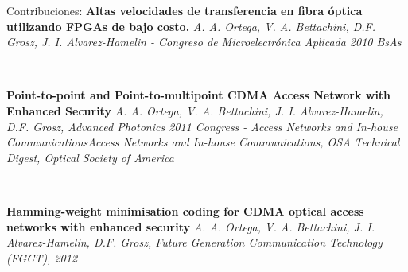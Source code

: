 \documentclass[aspectratio=169]{beamer}
\begin{document}



\begin{frame}{Contribuciones:}
\textbf{Altas velocidades de transferencia en fibra óptica utilizando FPGAs de bajo costo. } \textit{A. A. Ortega, V. A. Bettachini, D.F. Grosz, J. I. Alvarez-Hamelin - Congreso de Microelectrónica Aplicada 2010 BsAs}

\

\textbf{ Point-to-point and Point-to-multipoint CDMA Access Network with Enhanced Security} \textit{ A. A. Ortega, V. A. Bettachini, J. I. Alvarez-Hamelin,  D.F. Grosz, Advanced Photonics 2011 Congress - Access Networks and In-house CommunicationsAccess Networks and In-house Communications, OSA Technical Digest, Optical Society of America}

\

\textbf{Hamming-weight minimisation coding for CDMA optical access networks with enhanced security} \textit{ A. A. Ortega, V. A. Bettachini, J. I. Alvarez-Hamelin, D.F. Grosz, Future Generation Communication Technology (FGCT), 2012}


\end{frame}
\end{document}
